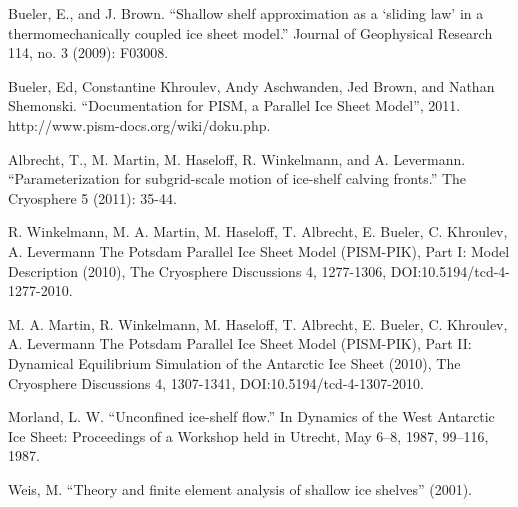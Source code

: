 \documentclass[a4paper,10pt]{article}
\begin{document}
\begin{thebibliography}{9}

 Bueler, E., and J. Brown. “Shallow shelf approximation as a ‘sliding law’ in a thermomechanically coupled ice sheet model.” Journal of Geophysical Research 114, no. 3 (2009): F03008.

Bueler, Ed, Constantine Khroulev, Andy Aschwanden, Jed Brown, and Nathan Shemonski. “Documentation for PISM, a Parallel Ice Sheet Model”, 2011. http://www.pism-docs.org/wiki/doku.php.

 Albrecht, T., M. Martin, M. Haseloff, R. Winkelmann, and A. Levermann. “Parameterization for subgrid-scale motion of ice-shelf calving fronts.” The Cryosphere 5 (2011): 35-44.

 R. Winkelmann, M. A. Martin, M. Haseloff, T. Albrecht, E. Bueler, C. Khroulev, A. Levermann
The Potsdam Parallel Ice Sheet Model (PISM-PIK), Part I: Model Description
(2010), The Cryosphere Discussions 4, 1277-1306, DOI:10.5194/tcd-4-1277-2010.
	 
 M. A. Martin, R. Winkelmann, M. Haseloff, T. Albrecht, E. Bueler, C. Khroulev, A. Levermann
The Potsdam Parallel Ice Sheet Model (PISM-PIK), Part II: Dynamical Equilibrium Simulation of the Antarctic Ice Sheet
(2010), The Cryosphere Discussions 4, 1307-1341, DOI:10.5194/tcd-4-1307-2010.

 Morland, L. W. “Unconfined ice-shelf flow.” In Dynamics of the West Antarctic Ice Sheet: Proceedings of a Workshop held in Utrecht, May 6–8, 1987, 99–116, 1987.


 Weis, M. “Theory and finite element analysis of shallow ice shelves” (2001).


\end{thebibliography}
\end{document}
